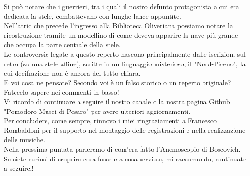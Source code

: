 \documentclass[hidelinks,12pt,a4paper]{article}
\begin{document}
\begin{flushleft}
		Si può notare che i guerrieri, tra i quali il nostro defunto protagonista a cui era dedicata la stele, combattevano con lunghe lance appuntite.\\
		Nell'atrio che precede l'ingresso alla Biblioteca Oliveriana possiamo notare la ricostruzione tramite un modellino di come doveva apparire la nave più grande che occupa la parte centrale della stele.\\ 
		Le controversie legate a questo reperto nascono principalmente dalle iscrizioni sul retro (su una stele affine), scritte in un linguaggio misterioso, il "Nord-Piceno", la cui decifrazione non è ancora del tutto chiara.\\
		E voi cosa ne pensate? Secondo voi è un falso storico o un reperto originale? Fatecelo sapere nei commenti in basso!\\
		Vi ricordo di continuare a seguire il nostro canale o la nostra pagina Github "Pomodoro Musei di Pesaro" per avere ulteriori aggiornamenti.\\
		Per concludere, come sempre, rinnovo i miei ringraziamenti a Francesco Rombaldoni per il supporto nel montaggio delle registrazioni e nella realizzazione delle musiche.\\
		Nella prossima puntata parleremo di com'era fatto l'Anemoscopio di Boscovich. Se siete curiosi di scoprire cosa fosse e a cosa servisse, mi raccomando, continuate a seguirci!\\
		

\end{flushleft}
\end{document}
